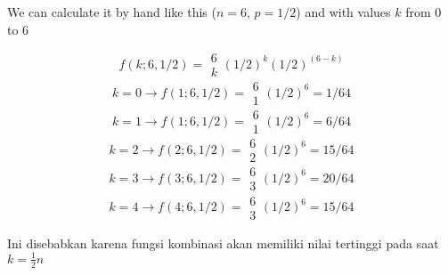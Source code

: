 \documentclass[12pt,a4paper]{article}
\begin{document}
We can calculate it by hand like this ($n=6$, $p=1/2$) and with values $k$ from 0 to 6

\[
f(k; 6, 1/2) = \begin{array}{c}6\\k\end{array}(1/2)^k (1/2)^{(6-k)}
\]
\[ k=0 \to f(1;6,1/2) = \begin{array}{c}6\\1\end{array}(1/2)^6 = 1/64 \]
\[ k=1 \to f(1;6,1/2) = \begin{array}{c}6\\1\end{array}(1/2)^6 = 6/64 \]
\[ k=2 \to f(2;6,1/2) = \begin{array}{c}6\\2\end{array}(1/2)^6 = 15/64 \]
\[ k=3 \to f(3;6,1/2) = \begin{array}{c}6\\3\end{array}(1/2)^6 = 20/64 \]
\[ k=4 \to f(4;6,1/2) = \begin{array}{c}6\\3\end{array}(1/2)^6 = 15/64 \]

Ini disebabkan karena fungsi kombinasi akan memiliki nilai tertinggi pada saat $k = \frac{1}{2}n$
\end{document}
